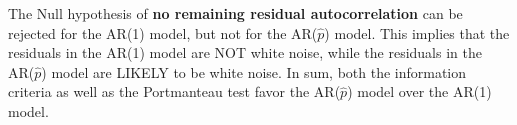 
The Null hypothesis of \textbf{no remaining residual autocorrelation} can be rejected for the AR{(1)} model,
  but not for the AR{(\(\hat{p}\))} model.
This implies that the residuals in the AR{(1)} model are NOT white noise,
  while the residuals in the AR{(\(\hat{p}\))} model are LIKELY to be white noise.
In sum, both the information criteria as well as the Portmanteau test favor the AR{(\(\hat{p}\))} model over the AR{(1)} model.